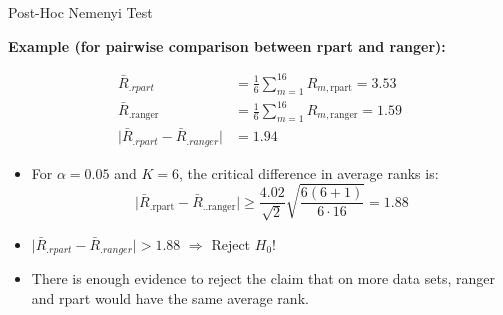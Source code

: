 \documentclass[11pt,compress,t,notes=noshow, aspectratio=169, xcolor=table]{beamer}
\begin{document}
\begin{frame}{Post-Hoc Nemenyi Test}

\textbf{Example (for pairwise comparison between rpart and ranger):}

\begin{align*}
    \bar{R}_{.rpart} &= \frac{1}{6} \sum_{m=1}^{16} R_{m, \text{rpart}} = 3.53 \\
    \bar{R}_{.\text{ranger}} &= \frac{1}{6} \sum_{m=1}^{16} R_{m, \text{ranger}} = 1.59 \\
    \vert \bar{R}_{.rpart} - \bar{R}_{.ranger} \vert &= 1.94
\end{align*}
\begin{itemize}
    \item For $\alpha = 0.05$ and $K = 6$, the critical difference in average ranks is:
    $$
    \vert \bar{R}_{.\text{rpart}} - \bar{R}_{..\text{ranger}} \vert \geq \frac{4.02}{\sqrt{2}} \sqrt{\frac{6(6 + 1)}{6 \cdot 16}}
     = 1.88 $$
    \item $\vert \bar{R}_{.rpart} - \bar{R}_{.ranger} \vert > 1.88$ $\Rightarrow$ Reject $H_0$!
    \item There is enough evidence to reject the claim that on more data sets, ranger and rpart would have the same average rank.
\end{itemize}
\end{frame}
\end{document}
